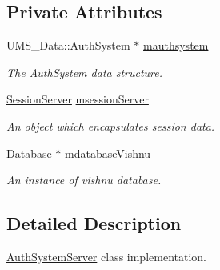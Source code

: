\subsection*{Private Attributes}
\begin{DoxyCompactItemize}
\item 
\hypertarget{classAuthSystemServer_aa702a0042f268f753854226da7a2206b}{
UMS\_\-Data::AuthSystem $\ast$ \hyperlink{classAuthSystemServer_aa702a0042f268f753854226da7a2206b}{mauthsystem}}
\label{classAuthSystemServer_aa702a0042f268f753854226da7a2206b}

\begin{DoxyCompactList}\small\item\em The AuthSystem data structure. \item\end{DoxyCompactList}\item 
\hypertarget{classAuthSystemServer_aa0b96a5e6181141a5ce81c03c86ed41c}{
\hyperlink{classSessionServer}{SessionServer} \hyperlink{classAuthSystemServer_aa0b96a5e6181141a5ce81c03c86ed41c}{msessionServer}}
\label{classAuthSystemServer_aa0b96a5e6181141a5ce81c03c86ed41c}

\begin{DoxyCompactList}\small\item\em An object which encapsulates session data. \item\end{DoxyCompactList}\item 
\hypertarget{classAuthSystemServer_a5aec263873ca812724a86ba07c880947}{
\hyperlink{classDatabase}{Database} $\ast$ \hyperlink{classAuthSystemServer_a5aec263873ca812724a86ba07c880947}{mdatabaseVishnu}}
\label{classAuthSystemServer_a5aec263873ca812724a86ba07c880947}

\begin{DoxyCompactList}\small\item\em An instance of vishnu database. \item\end{DoxyCompactList}\end{DoxyCompactItemize}


\subsection{Detailed Description}
\hyperlink{classAuthSystemServer}{AuthSystemServer} class implementation. 

